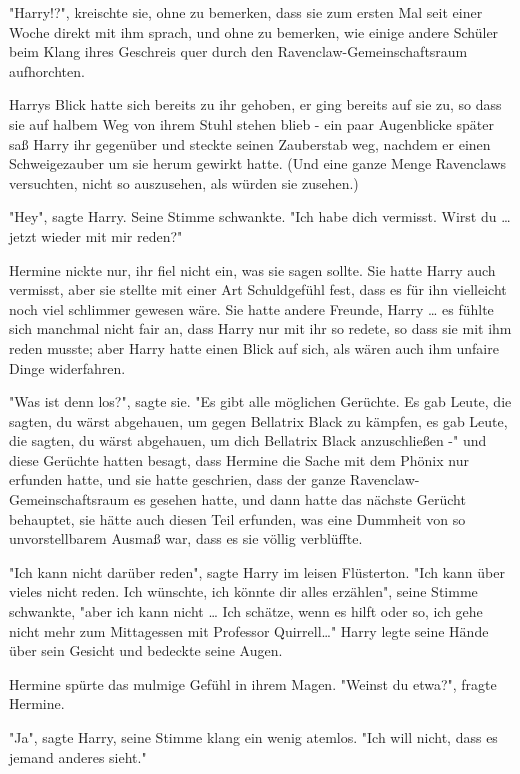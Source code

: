 {"Harry!?", kreischte sie, ohne zu bemerken, dass sie zum ersten Mal seit einer Woche direkt mit ihm sprach, und ohne zu bemerken, wie einige andere Schüler beim Klang ihres Geschreis quer durch den Ravenclaw-Gemeinschaftsraum aufhorchten.

Harrys Blick hatte sich bereits zu ihr gehoben, er ging bereits auf sie zu, so dass sie auf halbem Weg von ihrem Stuhl stehen blieb - ein paar Augenblicke später saß Harry ihr gegenüber und steckte seinen Zauberstab weg, nachdem er einen Schweigezauber um sie herum gewirkt hatte. (Und eine ganze Menge Ravenclaws versuchten, nicht so auszusehen, als würden sie zusehen.)

"Hey", sagte Harry. Seine Stimme schwankte. "Ich habe dich vermisst. Wirst du … jetzt wieder mit mir reden?"

Hermine nickte nur, ihr fiel nicht ein, was sie sagen sollte. Sie hatte Harry auch vermisst, aber sie stellte mit einer Art Schuldgefühl fest, dass es für ihn vielleicht noch viel schlimmer gewesen wäre. Sie hatte andere Freunde, Harry … es fühlte sich manchmal nicht fair an, dass Harry nur mit ihr so redete, so dass sie mit ihm reden musste; aber Harry hatte einen Blick auf sich, als wären auch ihm unfaire Dinge widerfahren.

"Was ist denn los?", sagte sie. "Es gibt alle möglichen Gerüchte. Es gab Leute, die sagten, du wärst abgehauen, um gegen Bellatrix Black zu kämpfen, es gab Leute, die sagten, du wärst abgehauen, um dich Bellatrix Black anzuschließen -" und diese Gerüchte hatten besagt, dass Hermine die Sache mit dem Phönix nur erfunden hatte, und sie hatte geschrien, dass der ganze Ravenclaw-Gemeinschaftsraum es gesehen hatte, und dann hatte das nächste Gerücht behauptet, sie hätte auch diesen Teil erfunden, was eine Dummheit von so unvorstellbarem Ausmaß war, dass es sie völlig verblüffte.

"Ich kann nicht darüber reden", sagte Harry im leisen Flüsterton. "Ich kann über vieles nicht reden. Ich wünschte, ich könnte dir alles erzählen", seine Stimme schwankte, "aber ich kann nicht … Ich schätze, wenn es hilft oder so, ich gehe nicht mehr zum Mittagessen mit Professor Quirrell…" Harry legte seine Hände über sein Gesicht und bedeckte seine Augen.

Hermine spürte das mulmige Gefühl in ihrem Magen. "Weinst du etwa?", fragte Hermine.

"Ja", sagte Harry, seine Stimme klang ein wenig atemlos. "Ich will nicht, dass es jemand anderes sieht."

}
